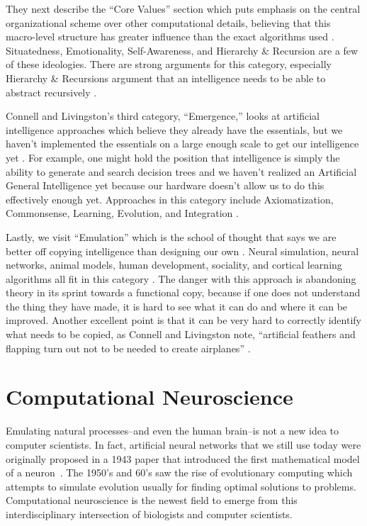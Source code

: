 \documentclass[oneside,12pt,openany]{book}
\begin{document}
	They next describe the ``Core Values'' section which puts emphasis on the central organizational scheme over other computational details, believing that this macro-level structure has greater influence than the exact algorithms used \cite{Connell}. Situatedness, Emotionality, Self-Awareness, and Hierarchy \& Recursion are a few of these ideologies. There are strong arguments for this category, especially Hierarchy \& Recursions argument that an intelligence needs to be able to abstract recursively \cite{Connell}.
	
	Connell and Livingston's third category, ``Emergence,'' looks at artificial intelligence approaches which believe they already have the essentials, but we haven't implemented the essentials on a large enough scale to get our intelligence yet \cite{Connell}. For example, one might hold the position that intelligence is simply the ability to generate and search decision trees and we haven't realized an Artificial General Intelligence yet because our hardware doesn't allow us to do this effectively enough yet. Approaches in this category include Axiomatization, Commonsense, Learning, Evolution, and Integration \cite{Connell}.
	
	Lastly, we visit ``Emulation'' which is the school of thought that says we are better off copying intelligence than designing our own \cite{Connell}. Neural simulation, neural networks, animal models, human development, sociality, and cortical learning algorithms all fit in this category \cite{Connell}. The danger with this approach is abandoning theory in its sprint towards a functional copy, because if one does not understand the thing they have made, it is hard to see what it can do and where it can be improved. Another excellent point is that it can be very hard to correctly identify what needs to be copied, as Connell and Livingston note, ``artificial feathers and flapping turn out not to be needed to create airplanes'' \cite{Connell}.
	
	\section{Computational Neuroscience}
	
	Emulating natural processes--and even the human brain--is not a new idea to computer scientists. In fact, artificial neural networks that we still use today were originally proposed in a 1943 paper that introduced the first mathematical model of a neuron~\cite{FundNatComp}. The 1950's and 60's saw the rise of evolutionary computing which attempts to simulate evolution usually for finding optimal solutions to problems. Computational neuroscience is the newest field to emerge from this interdisciplinary intersection of biologists and computer scientists.
	
\end{document}
